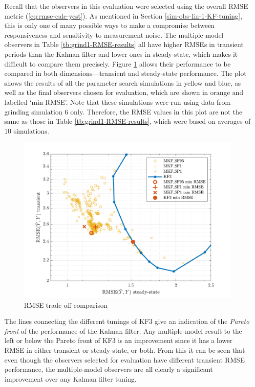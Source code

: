 Recall that the observers in this evaluation were selected using the overall RMSE metric (\ref{eq:rmse-calc-yest}). As mentioned in Section \ref{sim-obs-lin-1-KF-tuning}, this is only one of many possible ways to make a compromise between responsiveness and sensitivity to measurement noise. The multiple-model observers in Table \ref{tb:grind1-RMSE-results} all have higher RMSEs in transient periods than the Kalman filter and lower ones in steady-state, which makes it difficult to compare them precisely. Figure \ref{fig:grind1-RMSE-scatter} allows their performance to be compared in both dimensions---transient and steady-state performance. The plot shows the results of all the parameter search simulations in yellow and blue, as well as the final observers chosen for evaluation, which are shown in orange and labelled `min RMSE'. Note that these simulations were run using data from grinding simulation 6 only. Therefore, the RMSE values in this plot are not the same as those in Table \ref{tb:grind1-RMSE-results}, which were based on averages of 10 simulations.
\begin{figure}[htp]
	\centering
	\includegraphics[width=13cm]{images/grind1_rod_obs_sim_popt_RMSE_scatter.pdf}
	\caption{RMSE trade-off comparison}
	\label{fig:grind1-RMSE-scatter}
\end{figure}
The lines connecting the different tunings of KF3 give an indication of the \textit{Pareto front} of the performance of the Kalman filter. Any multiple-model result to the left or below the Pareto front of KF3 is an improvement since it has a lower RMSE in either transient or steady-state, or both. From this it can be seen that even though the observers selected for evaluation have different transient RMSE performance, the multiple-model observers are all clearly a significant improvement over any Kalman filter tuning.

